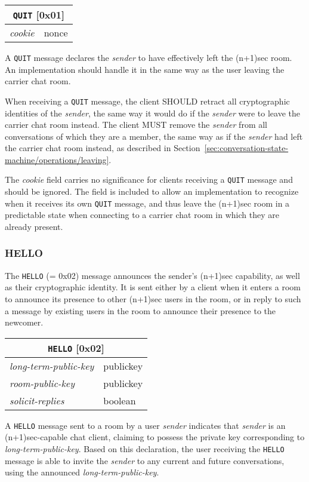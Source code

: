 \documentclass{article}
\def\npmessage#1{\texttt{#1}}
\def\field#1{\textit{#1}}
\def\type#1{\textsf{#1}}
\newenvironment{basicmessage}[2]{
\newcommand{\messagefield}[2]{
\field{##1} & \type{##2} \\
\hline
}
\hspace{2em minus 2em}\begin{tabular}{|l|l|}
\hline
\multicolumn{2}{|c|}{\npmessage{#1} [#2]} \\
\hline
\hline
}{
\end{tabular}
}
\begin{document}
\begin{basicmessage}{QUIT}{0x01}
\messagefield{cookie}{nonce}
\end{basicmessage}

A \npmessage{QUIT} message declares the \field{sender} to have effectively left the (n+1)sec room.
An implementation should handle it in the same way as the user leaving the carrier chat room.

When receiving a \npmessage{QUIT} message, the client SHOULD retract all cryptographic identities of the \field{sender}, the same way it would do if the \field{sender} were to leave the carrier chat room instead.
The client MUST remove the \field{sender} from all conversations of which they are a member, the same way as if the \field{sender} had left the carrier chat room instead, as described in Section~\ref{sec:conversation-state-machine/operations/leaving}.

The \field{cookie} field carries no significance for clients receiving a \npmessage{QUIT} message and should be ignored.
The field is included to allow an implementation to recognize when it receives its own \npmessage{QUIT} message, and thus leave the (n+1)sec room in a predictable state when connecting to a carrier chat room in which they are already present.


\subsubsection{HELLO}
\label{sec:messages/hello}

The \npmessage{HELLO} (= 0x02) message announces the sender's (n+1)sec capability, as well as their cryptographic identity.
It is sent either by a client when it enters a room to announce its presence to other (n+1)sec users in the room, or in reply to such a message by existing users in the room to announce their presence to the newcomer.

\begin{basicmessage}{HELLO}{0x02}
\messagefield{long-term-public-key}{publickey}
\messagefield{room-public-key}{publickey}
\messagefield{solicit-replies}{boolean}
\end{basicmessage}

A \npmessage{HELLO} message sent to a room by a user \field{sender} indicates that \field{sender} is an (n+1)sec-capable chat client, claiming to possess the private key corresponding to \field{long-term-public-key}.
Based on this declaration, the user receiving the \npmessage{HELLO} message is able to invite the \field{sender} to any current and future conversations, using the announced \field{long-term-public-key}.
\end{document}
